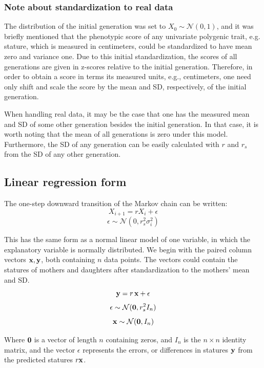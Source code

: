 \documentclass[letterpaper,10pt]{article} %
\begin{document}
\subsubsection*{Note about standardization to real data}
The distribution of the initial generation was set to $X_0 \sim \mathcal{N}(0, 1)$, and it was briefly mentioned that the phenotypic score of any univariate polygenic trait, e.g. stature, which is measured in centimeters, could be standardized to have mean zero and variance one. Due to this initial standardization, the scores of all generations are given in z-scores relative to the initial generation. Therefore, in order to obtain a score in terms its measured units, e.g., centimeters, one need only shift and scale the score by the mean and SD, respectively, of the initial generation. 

When handling real data, it may be the case that one has the measured mean and SD of some other generation besides the initial generation. In that case, it is worth noting that the mean of all generations is zero under this model. Furthermore, the SD of any generation can be easily calculated with $r$ and $r_s$ from the SD of any other generation.



\subsection{Linear regression form}

The one-step downward transition of the Markov chain can be written:
$$X_{i+1} = rX_i + \epsilon$$
$$\epsilon \sim \mathcal{N}(0, r_s^2 \sigma_i^2)$$

This has the same form as a normal linear model of one variable, in which the explanatory variable is normally distributed. We begin with the paired column vectors $\bold{x}, \bold{y}$, both containing $n$ data points. The vectors could contain the statures of mothers and daughters after standardization to the mothers' mean and SD. 
$$\bold{y} = r \, \bold{x} + \bold{\epsilon}$$
$$\bold{\epsilon} \sim \mathcal{N}(\bold{0}, r_s^2 I_n)$$
$$\bold{x} \sim \mathcal{N}(\bold{0}, I_n)$$

Where $\bold{0}$ is a vector of length $n$ containing zeros, and $I_n$ is the $n \times n$ identity matrix, and the vector $\epsilon$ represents the errors, or differences in statures $\bold{y}$ from the predicted statures $r\bold{x}$. 
\end{document}
